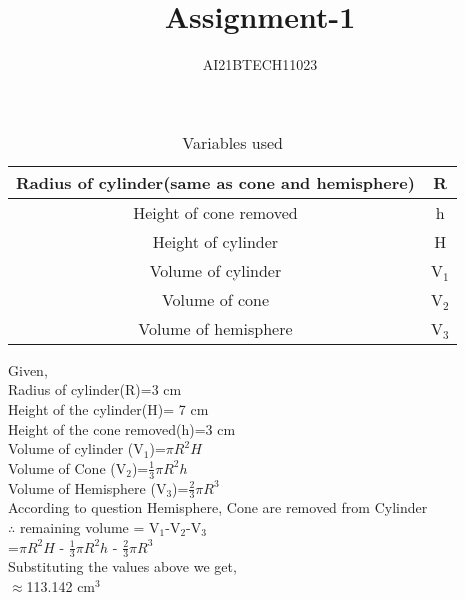 \documentclass[12pt]{article}
\begin{document}
\title{Assignment-1}
\author{AI21BTECH11023}
\maketitle
\begin{table}
\caption{Variables used}
\begin{tabular}{c c}
\hline
Radius of cylinder(same as cone and hemisphere) & R\\
\hline
Height of cone removed & h\\
\hline
Height of cylinder & H\\
\hline
Volume of cylinder & V$_1$\\
\hline
Volume of cone  & V$_2$\\
\hline
Volume of hemisphere & V$_3$\\
\hline
\end{tabular}
\end{table}
Given,\\
Radius of cylinder(R)=3 cm\\
Height of the cylinder(H)= 7 cm\\
Height of the cone removed(h)=3 cm\\
Volume of cylinder (V\(_1\))=$\pi R^2 H$\\
Volume of Cone (V\(_2\))=$\frac{1}{3} \pi R^2 h$\\
Volume of Hemisphere (V\(_3\))=$\frac{2}{3} \pi R^3$\\
According to question Hemisphere, Cone are removed from Cylinder\\
\(\therefore\) remaining volume = V$_1$-V$_2$-V$_3$\\
=$\pi R^2 H$ - $\frac{1}{3} \pi R^2 h$ - $\frac{2}{3} \pi R^3$\\
Substituting the values above we get,\\
$\approx$113.142 cm$^3$
\end{document}
